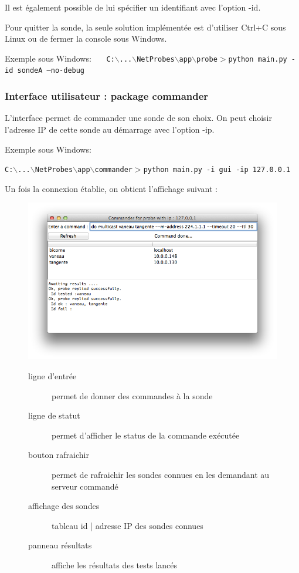 \documentclass[a4paper,11pt]{article}
\begin{document}
Il est également possible de lui spécifier un identifiant avec l'option -id.

Pour quitter la sonde, la seule solution implémentée est d'utiliser Ctrl+C sous Linux ou de fermer la console sous Windows.

Exemple sous Windows: \ \ \ \texttt{C:$\backslash$...$\backslash$NetProbes$\backslash$app$\backslash$probe$>$python main.py -id sondeA --no-debug}

\subsubsection{Interface utilisateur : package commander}
L'interface permet de commander une sonde de son choix. On peut choisir l'adresse IP de cette sonde au démarrage avec l'option -ip.

Exemple sous Windows:
\begin{center}
\texttt{C:$\backslash$...$\backslash$NetProbes$\backslash$app$\backslash$commander$>$python main.py -i gui -ip 127.0.0.1}
\end{center} 
Un fois la connexion établie, on obtient l'affichage suivant :

\begin{figure}[!ht]
\begin{minipage}[c]{0.5\linewidth}
\centering\includegraphics[width=\linewidth]{img/commander.png}
\end{minipage}
\hfill
\begin{minipage}[c]{0.5\linewidth}
\begin{description}
\item[ligne d'entrée] permet de donner des commandes à la sonde
\item[ligne de statut] permet d'afficher le status de la commande exécutée
\item[bouton rafraichir] permet de rafraichir les sondes connues en les demandant au serveur commandé
\item[affichage des sondes] tableau id | adresse IP des sondes connues
\item[panneau résultats] affiche les résultats des tests lancés
\end{description}
\end{minipage}
\end{figure}
\FloatBarrier
\end{document}

